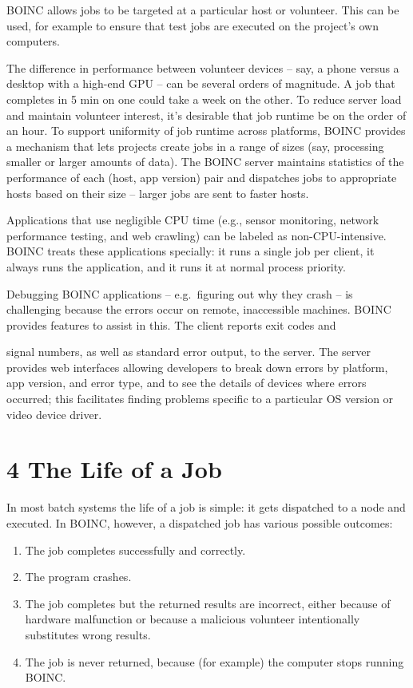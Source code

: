 \documentclass[
]{article}
\providecommand{\tightlist}{%
  \setlength{\itemsep}{0pt}\setlength{\parskip}{0pt}}
\begin{document}
BOINC allows jobs to be targeted at a particular host or volunteer. This
can be used, for example to ensure that test jobs are executed on the
project's own computers.

The difference in performance between volunteer devices -- say, a phone
versus a desktop with a high-end GPU -- can be several orders of
magnitude. A job that completes in 5 min on one could take a week on the
other. To reduce server load and maintain volunteer interest, it's
desirable that job runtime be on the order of an hour. To support
uniformity of job runtime across platforms, BOINC provides a mechanism
that lets projects create jobs in a range of sizes (say, processing
smaller or larger amounts of data). The BOINC server maintains
statistics of the performance of each (host, app version) pair and
dispatches jobs to appropriate hosts based on their size -- larger jobs
are sent to faster hosts.

Applications that use negligible CPU time (e.g., sensor monitoring,
network performance testing, and web crawling) can be labeled as
non-CPU-intensive. BOINC treats these applications specially: it runs a
single job per client, it always runs the application, and it runs it at
normal process priority.

Debugging BOINC applications -- e.g.~figuring out why they crash -- is
challenging because the errors occur on remote, inaccessible machines.
BOINC provides features to assist in this. The client reports exit codes
and

signal numbers, as well as standard error output, to the server. The
server provides web interfaces allowing developers to break down errors
by platform, app version, and error type, and to see the details of
devices where errors occurred; this facilitates finding problems
specific to a particular OS version or video device driver.

\section{4 The Life of a Job}\label{the-life-of-a-job}

In most batch systems the life of a job is simple: it gets dispatched to
a node and executed. In BOINC, however, a dispatched job has various
possible outcomes:

\begin{enumerate}
\def\labelenumi{\arabic{enumi}.}
\tightlist
\item
  The job completes successfully and correctly.\\
\item
  The program crashes.\\
\item
  The job completes but the returned results are incorrect, either
  because of hardware malfunction or because a malicious volunteer
  intentionally substitutes wrong results.\\
\item
  The job is never returned, because (for example) the computer stops
  running BOINC.
\end{enumerate}
\end{document}
